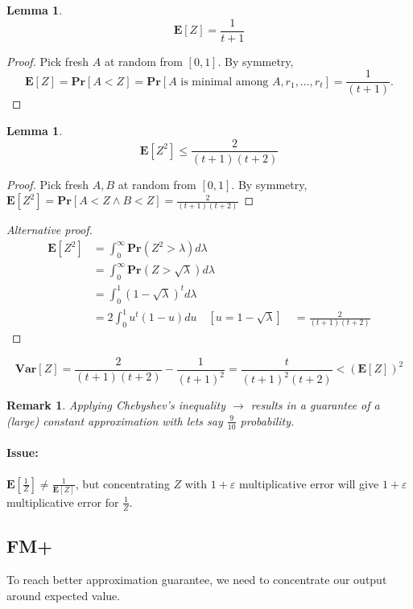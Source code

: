 \documentclass[11pt]{article}
\newcommand{\Ppb}{\mathbf{Pr}}
\newcommand{\Es}{\mathbf{E}}
\newcommand{\Var}{\mathbf{Var}}
\newtheorem{lemma}[theorem]{Lemma}
\newtheorem{remark}[theorem]{Remark}
\begin{document}
\begin{lemma}
\begin{equation}
    \Es[Z] = \frac{1}{t+1}
\end{equation}
\end{lemma}
\begin{proof}
Pick fresh $A$ at random from $[0,1]$. By symmetry, 
$$\Es[Z] = \Ppb[A<Z] = \Ppb[A\text{ is minimal among }{A,r_1,\dots,r_t}] = \frac{1}{(t+1)}.$$
\end{proof}
\begin{lemma}
\begin{equation}
\Es[Z^2] \leq \frac{2}{(t+1)(t+2)}
\end{equation}
\end{lemma}
\begin{proof}
Pick fresh $A, B$ at random from $[0, 1]$. By symmetry, $\Es[Z^2] = \Ppb[A<Z \wedge B<Z] = \frac{2}{(t+1)(t+2)}$ 
\end{proof}
\begin{proof}[Alternative proof]
\begin{align*}
\Es\left[Z^{2}\right] &=\int_{0}^{\infty} \Ppb\left(Z^{2}>\lambda\right) d \lambda \\
&=\int_{0}^{\infty} \Ppb(Z>\sqrt{\lambda}) d \lambda \\
&=\int_{0}^{1}(1-\sqrt{\lambda})^{t} d \lambda \\
&=2 \int_{0}^{1} u^{t}(1-u) d u \quad[u=1-\sqrt{\lambda}] \quad=\frac{2}{(t+1)(t+2)} \end{align*}
\end{proof}
\begin{equation}
\Var[Z]=\frac{2}{(t+1)(t+2)}-\frac{1}{(t+1)^{2}}=\frac{t}{(t+1)^{2}(t+2)}<(\Es[Z])^{2}
\end{equation}

\begin{remark}
Applying Chebyshev's inequality $\rightarrow$ results in a guarantee of a (large) constant approximation with lets say $\frac{9}{10}$ probability.
\end{remark}

\paragraph{Issue:} $\Es[\frac{1}{Z}] \neq \frac{1}{\Es[Z]}$, but concentrating $Z$ with $1+\varepsilon$ multiplicative error will give $1+\varepsilon$ multiplicative error for $\frac{1}{Z}$.

\subsection{FM+}
To reach better approximation guarantee, we need to concentrate our output around expected value.
\end{document}
